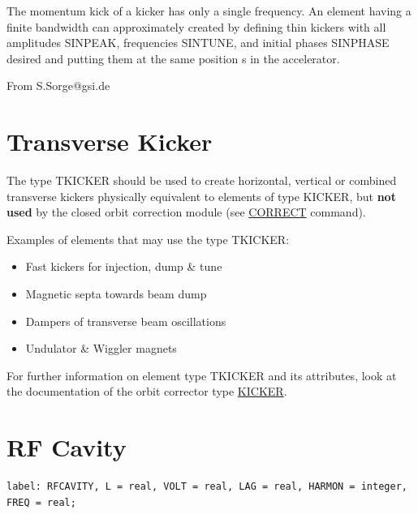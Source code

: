 The momentum kick of a kicker has only a single frequency. An element
having a finite bandwidth can approximately created by defining  thin
kickers with all amplitudes SINPEAK, frequencies SINTUNE, and  initial
phases SINPHASE desired and putting them at the same position s in  the
accelerator.   

From S.Sorge@gsi.de  


%
\section{Transverse Kicker}
The type TKICKER should be used to create horizontal, vertical or
combined transverse kickers physically equivalent to elements of type
KICKER, but \textbf{not used} by the closed orbit correction module (see
\href{../cororbit/co_correct.html}{CORRECT} command).   

Examples of elements that may use the type TKICKER: 
\begin{itemize}
   \item Fast kickers for injection, dump \& tune
   \item Magnetic septa towards beam dump
   \item Dampers of transverse beam oscillations
   \item Undulator \& Wiggler magnets
\end{itemize}

For further information on element type TKICKER and its attributes, look
at the documentation of the orbit corrector type
\href{kickers.html#kick}{KICKER}.   



%
\section{RF Cavity}
\label{sec:rf_cavity}

\begin{verbatim}
label: RFCAVITY, L = real, VOLT = real, LAG = real, HARMON = integer, FREQ = real;                  
\end{verbatim} 



